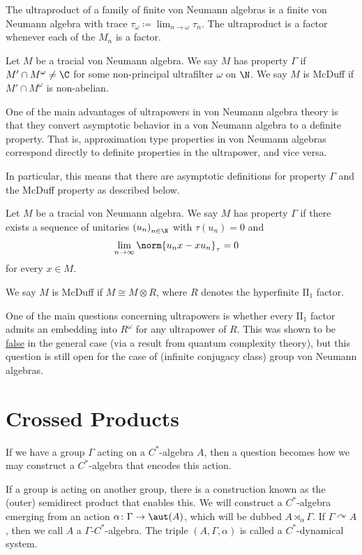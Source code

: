 \documentclass[10pt]{mypackage}
\renewcommand{\coloneq}{\coloneqq}
\begin{document}
\begin{theorem}
  The ultraproduct of a family of finite von Neumann algebras is a finite von Neumann algebra with trace $\tau_{\omega}\coloneq \lim_{n\rightarrow\omega}\tau_n$. The ultraproduct is a factor whenever each of the $M_n$ is a factor.
\end{theorem}
\begin{definition}
  Let $M$ be a tracial von Neumann algebra. We say $M$ has property $\Gamma$ if $M'\cap M^{\omega}\neq \C$ for some non-principal ultrafilter $\omega$ on $\N$. We say $M$ is McDuff if $M'\cap M^{\omega}$ is non-abelian.
\end{definition}
One of the main advantages of ultrapowers in von Neumann algebra theory is that they convert asymptotic behavior in a von Neumann algebra to a definite property. That is, approximation type properties in von Neumann algebras correspond directly to definite properties in the ultrapower, and vice versa.

In particular, this means that there are asymptotic definitions for property $\Gamma$ and the McDuff property as described below.
\begin{definition}
  Let $M$ be a tracial von Neumann algebra. We say $M$ has property $\Gamma$ if there exists a sequence of unitaries $\left( u_n \right)_{n\in \N}$ with $\tau\left( u_n \right) = 0$ and
  \begin{align*}
    \lim_{n\rightarrow\infty} \norm{u_nx-xu_n}_{\tau} &= 0
  \end{align*}
  for every $x\in M$.

  We say $M$ is McDuff if $M\cong M\otimes R$, where $R$ denotes the hyperfinite $\text{II}_1$ factor.
\end{definition}
One of the main questions concerning ultrapowers is whether every $\text{II}_{1}$ factor admits an embedding into $R^{\omega}$ for any ultrapower of $R$. This was shown to be \href{https://arxiv.org/pdf/2109.12682}{false} in the general case (via a result from quantum complexity theory), but this question is still open for the case of (infinite conjugacy class) group von Neumann algebras.
\section{Crossed Products}%
If we have a group $\Gamma$ acting on a $C^{\ast}$-algebra $A$, then a question becomes how we may construct a $C^{\ast}$-algebra that encodes this action.

If a group is acting on another group, there is a construction known as the (outer) semidirect product that enables this. We will construct a $C^{\ast}$-algebra emerging from an action $\alpha\colon \Gamma\rightarrow \aut(A)$, which will be dubbed $A\rtimes_{\alpha}\Gamma$. If $\Gamma\curvearrowright A$, then we call $A$ a $\Gamma$-$C^{\ast}$-algebra. The triple $\left( A,\Gamma,\alpha \right)$ is called a $C^{\ast}$-dynamical system.
\end{document}
